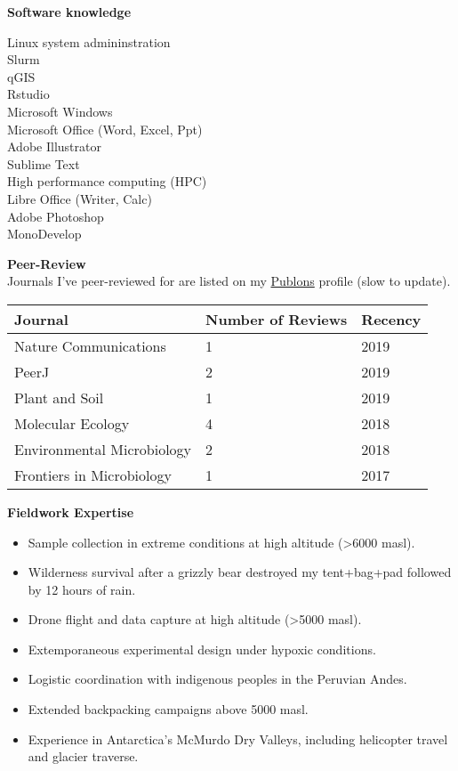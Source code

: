 \documentclass{article}
\begin{document}
{\large  \textbf{Software knowledge}}
  \begin{adjustwidth}{2mm}{}\begin{multicols}{3}
    Linux system admininstration\\
    Slurm\\
    qGIS\\
    Rstudio\\

    Microsoft Windows\\
    Microsoft Office (Word, Excel, Ppt)\\
    Adobe Illustrator\\
    Sublime Text\\

    High performance computing (HPC)\\
    Libre Office (Writer, Calc)\\
    Adobe Photoshop\\
    MonoDevelop\\
  \end{multicols}\end{adjustwidth}


{\large  \textbf{Peer-Review}}\\
Journals I've peer-reviewed for are listed on my \href{https://publons.com/researcher/1262170/john-l-darcy/peer-review/}{Publons} profile (slow to update). 
\\\begin{tabular}{l l l}
  Journal & Number of Reviews & Recency\\
  \hline
  Nature Communications & 1 & 2019\\
  PeerJ & 2 & 2019\\
  Plant and Soil & 1 & 2019\\
  Molecular Ecology & 4 & 2018\\
  Environmental Microbiology & 2 & 2018\\
  Frontiers in Microbiology & 1 & 2017\\
\end{tabular}

\vspace{3mm}
{\large  \textbf{Fieldwork Expertise}}
\begin{itemize}[noitemsep,topsep=0pt, leftmargin=5mm]
  \item Sample collection in extreme conditions at high altitude (>6000 masl).
  \item Wilderness survival after a grizzly bear destroyed my tent+bag+pad followed by 12 hours of rain.
  \item Drone flight and data capture at high altitude (>5000 masl).
  \item Extemporaneous experimental design under hypoxic conditions.
  \item Logistic coordination with indigenous peoples in the Peruvian Andes.
  \item Extended backpacking campaigns above 5000 masl.
  \item Experience in Antarctica’s McMurdo Dry Valleys, including helicopter travel and glacier traverse.
\end{itemize}
\end{document}
